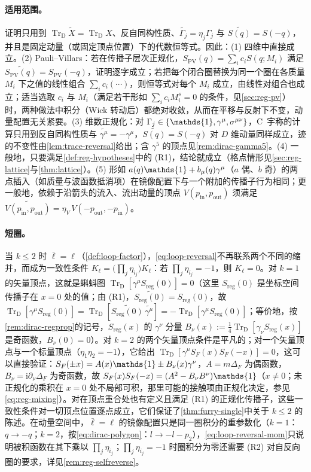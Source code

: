 \documentclass[UTF8,a4paper,11pt,fontset=fandol]{ctexart}
\let\amsmathbb\mathbb
\renewcommand{\mathbb}[1]{\ifx1#1\mathds{1}\else\amsmathbb{#1}\fi}
\theoremstyle{cplain}
\theoremstyle{cdefinition}
\theoremstyle{cremark}
\numberwithin{equation}{section}
\newcommand{\TrD}{\operatorname{Tr}_{\mathrm{D}}}   %
\newcommand{\SF}{S_{F}}                              %
\newcommand{\ii}{\mathrm{i}}                        %
\newcommand{\Cconj}[1]{\widetilde{#1}}              %
\begin{document}
\paragraph{适用范围。}证明只用到 $\TrD\Cconj X=\TrD X$、反自同构性质、$\Cconj{\Gamma_j}=\eta_j\Gamma_j$ 与 $\Cconj{S(q)}=S(-q)$，并且是固定动量（或固定顶点位置）下的代数恒等式。因此：(1) 四维中直接成立。(2) Pauli--Villars：若在传播子层次正规化，$S_{\mathrm{PV}}(q)=\sum_ic_iS(q;M_i)$ 满足 $\Cconj{S_{\mathrm{PV}}(q)}=S_{\mathrm{PV}}(-q)$，证明逐字成立；若把每个闭合圈替换为同一个圈在各质量 $M_i$ 下之值的线性组合 $\sum_ic_i(\cdots)$，则恒等式对每个 $M_i$ 成立，由线性对组合也成立；适当选取 $c_i$ 与 $M_i$（满足若干形如 $\sum_ic_iM_i^s=0$ 的条件，见\cref{sec:reg-pv}）时，两种做法中积分（Wick 转动后）都绝对收敛，从而在平移与反射下不变，动量配置无关紧要。(3) 维数正规化：对 $\Gamma_j\in\{\mathbb 1,\gamma^\mu,\sigma^{\mu\nu}\}$，C~宇称的计算只用到反自同构性质与 $\Cconj{\gamma^\mu}=-\gamma^\mu$，$\Cconj{S(q)}=S(-q)$ 对 $D$ 维动量同样成立，迹的不变性由\cref{lem:trace-reversal}给出；含 $\gamma^5$ 的顶点见\cref{rem:dirac-gamma5}。(4) 一般地，只要满足\cref{def:reg-hypotheses}中的 (R1)，结论就成立（格点情形见\cref{sec:reg-lattice}与\cref{thm:lattice}）。(5) 形如 $a(q)\mathbb 1+b_\mu(q)\gamma^\mu$（$a$ 偶、$b$ 奇）的两点插入（如质量与波函数抵消项）在镜像配置下与一个附加的传播子行为相同；更一般地，依赖于沿箭头的流入、流出动量的顶点 $V(p_{\mathrm{in}},p_{\mathrm{out}})$ 须满足 $\Cconj{V(p_{\mathrm{in}},p_{\mathrm{out}})}=\eta_V\,V(-p_{\mathrm{out}},-p_{\mathrm{in}})$。

\paragraph{短圈。}当 $k\le2$ 时 $\bar\ell=\ell$（\cref{def:loop-factor}），\cref{eq:loop-reversal}不再联系两个不同的缩并，而成为一致性条件 $K_\ell=\bigl(\prod_j\eta_{i_j}\bigr)K_\ell$：若 $\prod_j\eta_{i_j}=-1$，则 $K_\ell=0$。对 $k=1$ 的矢量顶点，这就是蝌蚪图 $\TrD[\gamma^\mu S_{\mathrm{reg}}(0)]=0$（这里 $S_{\mathrm{reg}}(0)$ 是坐标空间传播子在 $x=0$ 处的值；由 (R1)，$\Cconj{S_{\mathrm{reg}}(0)}=S_{\mathrm{reg}}(0)$，故 $\TrD[\gamma^\mu S_{\mathrm{reg}}(0)]=\TrD[\Cconj{S_{\mathrm{reg}}(0)}\,\Cconj{\gamma^\mu}]=-\TrD[\gamma^\mu S_{\mathrm{reg}}(0)]$；等价地，按\cref{rem:dirac-regprop}的记号，$S_{\mathrm{reg}}(x)$ 的 $\gamma^\nu$ 分量 $B_\nu(x):=\tfrac14\TrD[\gamma_\nu S_{\mathrm{reg}}(x)]$ 是奇函数，$B_\nu(0)=0$）。对 $k=2$ 的两个矢量顶点条件是平凡的；对一个矢量顶点与一个标量顶点（$\eta_1\eta_2=-1$），它给出 $\TrD[\gamma^\mu\SF(x)\SF(-x)]=0$，这可以直接验证：$\SF(\pm x)=A(x)\mathbb 1\pm B_\nu(x)\gamma^\nu$，$A=m\Delta_F$ 为偶函数，$B_\nu=\ii\partial_\nu\Delta_F$ 为奇函数，故 $\SF(x)\SF(-x)=(A^2-B_\nu B^\nu)\mathbb 1$（$x\neq0$；未正规化的乘积在 $x=0$ 处不局部可积，那里可能的接触项由正规化决定，参见\cref{eq:reg-mixing}）。对在顶点重合处也有定义且满足 (R1) 的正规化传播子，这些一致性条件对一切顶点位置逐点成立，它们保证了\cref{thm:furry-single}中关于 $k\le2$ 的陈述。在动量空间中，$\bar\ell=\ell$ 的镜像配置只是同一圈积分的重参数化（$k=1$：$q\to-q$；$k=2$，按\cref{eq:dirac-polygon}：$l\to-l-p_2$），\cref{eq:loop-reversal-mom}只说明被积函数在其下乘以 $\prod_j\eta_{i_j}$；$\prod_j\eta_{i_j}=-1$ 时圈积分为零还需要 (R2) 对自反向圈的要求，详见\cref{rem:reg-selfreverse}。
\end{document}
